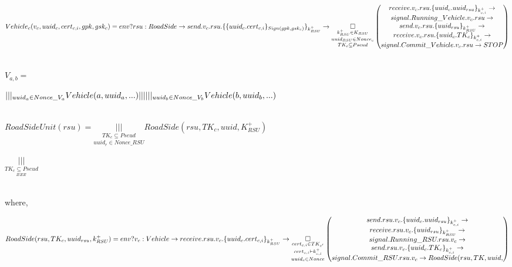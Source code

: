 \documentclass[]{article}
\begin{document}
\parbox[t]{1.2\textwidth}{$Vehicle_c(v_c, uuid_c, cert_{c,i}, gpk, gsk_c) = \\ 
env?rsu:RoadSide \rightarrow send.v_c.rsu.\{ \{uuid_c.cert_{c,i} \}_{Sign(gpk, gsk_{c})}\}_{k^{+}_{RSU}} \rightarrow \\
  \underset{TK_c \subseteq Pseud}{\underset{uuid_{RSU} \in Nonce_c}{\underset{ k^{+}_{RSU} \in K_{RSU} }{\Box}}}
  \begin{pmatrix}
    receive.v_c.rsu.\{uuid_c.uuid_{rsu}\}_{k^{+}_{c, i}} \rightarrow \\
    signal.Running\_Vehicle.v_c.rsu \rightarrow \\
    send.v_c.rsu.\{ uuid_{rsu}\}_{k^{+}_{RSU}} \rightarrow \\
    receive.v_c.rsu.\{ uuid_c.TK_c\}_{k^{+}_{c, i}} \rightarrow \\
    signal.Commit\_Vehicle.v_c.rsu \rightarrow STOP
  \end{pmatrix}
$} 
\\
$V_{a, b} = $ \parbox[t]{1.2\textwidth}{$|||_{uuid_a \in Nonce\_V_a} Vehicle(a, uuid_a, ...) \\ 
||| \\
|||_{uuid_b \in Nonce\_V_b} Vehicle(b, uuid_b, ...)  \\
$}
\\


$RoadSideUnit(rsu) = \underset{uuid_r \in Nonce\_RSU}{\underset{TK_c \subseteq Pseud}{|||}} RoadSide(rsu, TK_c, uuid, K^{+}_{RSU})$

$\underset{xxx}{\underset{TK_c \subseteq Pseud}{|||}}$

\\
where,
	
\parbox[t]{1.2\textwidth}{$RoadSide(rsu, TK_c, uuid_{rsu}, k^{+}_{RSU}) = \\ 
env?v_c:Vehicle \rightarrow  receive.rsu.v_c.\{uuid_c.cert_{c, i}\}_{k^{+}_{RSU}} \rightarrow \\
  \underset{uuid_{c} \in Nonce}{\underset{cert_{c, i} \vdash k^{+}_{c,i}}{\underset{ cert_{c, i} \in TK_{c'} }{\Box}}}
  \begin{pmatrix}
    send.rsu.v_c.\{uuid_c.uuid_{rsu}\}_{k^{+}_{c, i}} \rightarrow \\
    receive.rsu.v_c.\{ uuid_{rsu}\}_{k^{+}_{RSU}} \rightarrow \\
    signal.Running\_RSU.rsu.v_c \rightarrow \\
    send.rsu.v_c.\{ uuid_c.TK_c\}_{k^{+}_{c, i}} \rightarrow \\
    signal.Commit\_RSU.rsu.v_c \rightarrow RoadSide(rsu, TK, uuid,  
  \end{pmatrix}
$} 
\\
\end{document}

